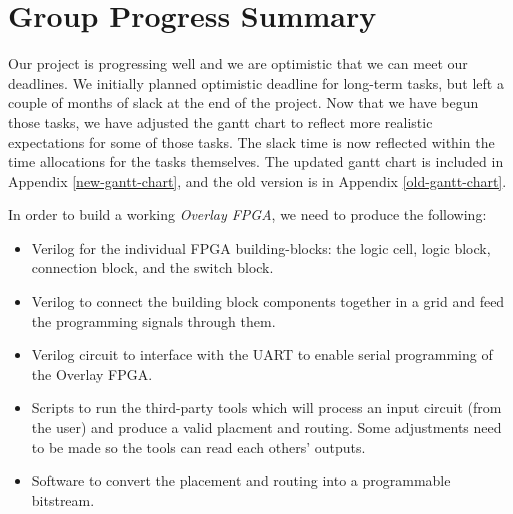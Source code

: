 \section{Group Progress Summary}



Our project is progressing well and we are optimistic that we can meet our deadlines.
We initially planned optimistic deadline for long-term tasks, but left a couple of months of slack at the end of the project.
Now that we have begun those tasks, we have adjusted the gantt chart to reflect more realistic expectations for some of those tasks.
The slack time is now reflected within the time allocations for the tasks themselves.
The updated gantt chart is included in Appendix \ref{new-gantt-chart}, and the old version is in Appendix \ref{old-gantt-chart}.

In order to build a working \emph{Overlay FPGA}, we need to produce the following:
\begin{itemize}
\item Verilog for the individual FPGA building-blocks: the logic cell, logic block, connection block, and the switch block.
\item Verilog to connect the building block components together in a grid and feed the programming signals through them.
\item Verilog circuit to interface with the UART to enable serial programming of the Overlay FPGA.
\item Scripts to run the third-party tools which will process an input circuit (from the user) and produce a valid placment and routing. Some adjustments need to be made so the tools can read each others' outputs.
\item Software to convert the placement and routing into a programmable bitstream.
\end{itemize}

